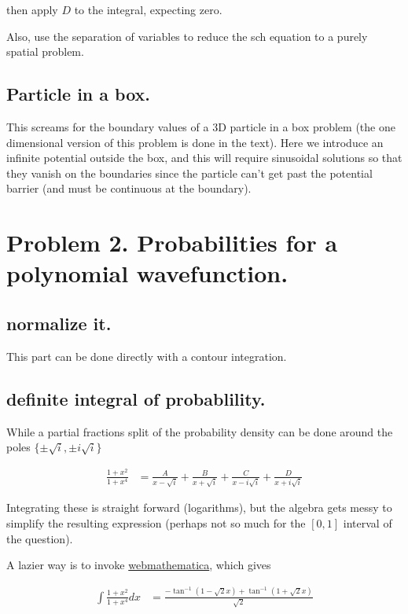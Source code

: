 \documentclass{article}
\begin{document}
then apply $D$ to the integral, expecting zero.

Also, use the separation of variables to reduce the sch equation to a purely
spatial problem.

\subsection{ Particle in a box. }

This screams for the boundary values of a 3D particle in a box problem
(the one dimensional version of this problem is done in the text).
Here we introduce an infinite potential outside the
box, and this will require sinusoidal solutions so that they vanish on
the boundaries since the particle can't get past the potential
barrier (and must be continuous at the boundary).

\section{ Problem 2. Probabilities for a polynomial wavefunction. }

\subsection{ normalize it. }

This part can be done directly with a contour integration.

\subsection{ definite integral of probablility. }

While a partial fractions split of the probability density can be done
around the poles $\{\pm\sqrt{i}, \pm i \sqrt{i}\}$

\begin{align*}
\frac{1 + x^2}{1 + x^4} &=
\frac{A}{x -\sqrt{i}}
+\frac{B}{x +\sqrt{i}}
+\frac{C}{x -i\sqrt{i}}
+\frac{D}{x +i\sqrt{i}}
\end{align*}

Integrating these is straight forward (logarithms), but
the algebra gets messy to simplify the resulting expression (perhaps not so
much for the $[0,1]$ interval of the question).

A lazier way is to invoke \href{http://integrals.wolfram.com/index.jsp}{webmathematica}, which gives

\begin{align*}
\int \frac{1 + x^2}{1 + x^4} dx &=
\frac{-\tan^{-1}(1 - \sqrt{2} x) + \tan^{-1}(1 + \sqrt{2} x)}{ \sqrt{2} }
\end{align*}



\end{document}
